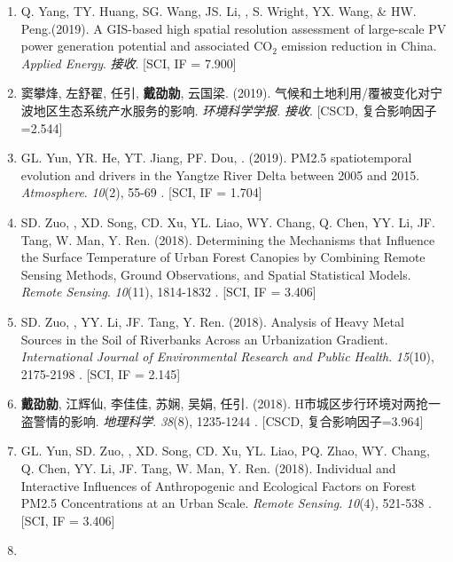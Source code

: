 \begin{enumerate}
\item
    Q. Yang, TY. Huang, SG. Wang, JS. Li, \Shaoqing, S. Wright, YX. Wang, \& HW. Peng.(2019).
    A GIS-based high spatial resolution assessment of large-scale PV power generation potential and associated CO$_2$ emission reduction in China.
    \textit{Applied Energy}. %
    \textit{接收}. [SCI, IF = 7.900] %
\item
    窦攀烽, 左舒翟, 任引, \textbf{戴劭勍}, 云国梁. (2019).
    气候和土地利用/覆被变化对宁波地区生态系统产水服务的影响.
    \textit{环境科学学报}. %
    \textit{接收}. [CSCD, 复合影响因子=2.544] %
\item
    GL. Yun, YR. He, YT. Jiang, PF. Dou, \Shaoqing. (2019).
    PM2.5 spatiotemporal evolution and drivers in the Yangtze River Delta between 2005 and 2015.
    \textit{Atmosphere}. \textit{10}(2), 55-69
    . [SCI, IF = 1.704]
\item
    SD. Zuo, \Shaoqing, XD. Song, CD. Xu, YL. Liao, WY. Chang, Q. Chen, YY. Li, JF. Tang, W. Man, Y. Ren. (2018).
    Determining the Mechanisms that Influence the Surface Temperature of Urban Forest Canopies by Combining Remote Sensing Methods, Ground Observations, and Spatial Statistical Models. 
    \textit{Remote Sensing}. \textit{10}(11), 1814-1832
    . [SCI, IF = 3.406]
\item
    SD. Zuo, \Shaoqing, YY. Li, JF. Tang, Y. Ren. (2018).
	Analysis of Heavy Metal Sources in the Soil of Riverbanks Across an Urbanization Gradient.
    \textit{International Journal of Environmental Research and Public Health}. \textit{15}(10), 2175-2198
    . [SCI, IF = 2.145]
\item
    \textbf{戴劭勍}, 江辉仙, 李佳佳, 苏娴, 吴娟, 任引. (2018).
	H市城区步行环境对两抢一盗警情的影响.
    \textit{地理科学}.  \textit{38}(8), 1235-1244
    . [CSCD, 复合影响因子=3.964]
\item
    GL. Yun, SD. Zuo, \Shaoqing, XD. Song, CD. Xu, YL. Liao, PQ. Zhao, WY. Chang, Q. Chen, YY. Li, JF. Tang, W. Man, Y. Ren. (2018).
	Individual and Interactive Influences of Anthropogenic and Ecological Factors on Forest PM2.5 Concentrations at an Urban Scale.
    \textit{Remote Sensing}. \textit{10}(4), 521-538
    . [SCI, IF = 3.406]
\item

\end{enumerate}

